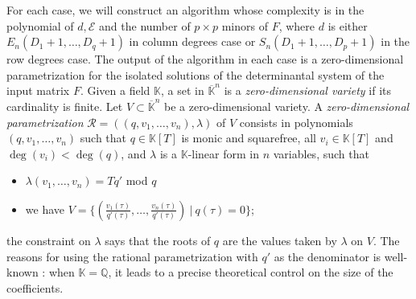\documentclass[11pt]{article}
\numberwithin{Property}{section}
\numberwithin{Theorem}{section}
\numberwithin{Proposition}{section}
\numberwithin{Lemma}{section}
\numberwithin{Corollary}{section}
\numberwithin{Definition}{section}
\numberwithin{Remark}{section}
\numberwithin{Conjecture}{section}
\numberwithin{Problem}{section}
\numberwithin{Claim}{section}
\theoremstyle{definition}
\numberwithin{Example}{section}
\def\bar{\overline}
\newcommand{\field}{\mathbb{K}} %
\begin{document}
For each case, we will construct an algorithm whose complexity is in the polynomial of $d, \mathcal{E}$ and the number of $p \times p$ minors of $F$, where $d$ is either $E_n(D_1+1, \ldots, D_q+1)$ in column degrees case or $S_n(D_1+1, \ldots, D_p+1)$ in the row degrees case. The output of the algorithm in each case is a zero-dimensional parametrization for the isolated solutions of the determinantal system of the input matrix $F$. Given a field $\field$, a set in $\bar{\field}^n$ is a \emph{zero-dimensional variety} if its cardinality is finite. Let $V \subset \bar{\field}^n$ be a zero-dimensional variety. A \emph{zero-dimensional parametrization} $\mathscr{R} = ((q,v_1, \ldots, v_n), \lambda)$ of $V$ consists in polynomials $(q,v_1, \ldots, v_n)$ such that $q \in \field[T]$ is monic and squarefree, all $v_i \in \field[T]$ and $\deg(v_i) < \deg(q)$, and $\lambda$ is a $\field$-linear form in $n$ variables, such that 
\begin{itemize}
\item $\lambda(v_1, \ldots, v_n) = Tq'$ mod $q$
\item we have $V = \{(\frac{v_1(\tau)}{q'(\tau)}, \ldots, \frac{v_n(\tau)}{q'(\tau)}) \ | \ q(\tau) = 0\}$;
\end{itemize}
the constraint on $\lambda$ says that the roots of $q$ are the values taken by $\lambda$ on $V$. The reasons for using the rational parametrization with $q'$ as the denominator is well-known \cite{Alonso1996, SaSc16, GiLeSa01, Rouillier1999} : when $\field = \mathbb{Q}$, it leads to a precise theoretical control on the size of the coefficients. 
\end{document}
